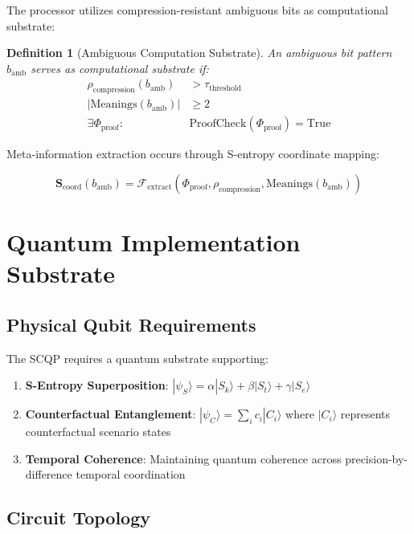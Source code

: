 \documentclass[12pt,a4paper]{article}
\newtheorem{definition}{Definition}
\begin{document}
The processor utilizes compression-resistant ambiguous bits as computational substrate:

\begin{definition}[Ambiguous Computation Substrate]
An ambiguous bit pattern $b_{\text{amb}}$ serves as computational substrate if:
\begin{align}
\rho_{\text{compression}}(b_{\text{amb}}) &> \tau_{\text{threshold}} \\
|\text{Meanings}(b_{\text{amb}})| &\geq 2 \\
\exists \Phi_{\text{proof}}: &\text{ProofCheck}(\Phi_{\text{proof}}) = \text{True}
\end{align}
\end{definition}

Meta-information extraction occurs through S-entropy coordinate mapping:

\begin{equation}
\mathbf{S}_{\text{coord}}(b_{\text{amb}}) = \mathcal{F}_{\text{extract}}(\Phi_{\text{proof}}, \rho_{\text{compression}}, \text{Meanings}(b_{\text{amb}}))
\end{equation}

\section{Quantum Implementation Substrate}

\subsection{Physical Qubit Requirements}

The SCQP requires a quantum substrate supporting:

\begin{enumerate}
\item \textbf{S-Entropy Superposition}: $|\psi_S\rangle = \alpha|S_k\rangle + \beta|S_t\rangle + \gamma|S_e\rangle$
\item \textbf{Counterfactual Entanglement}: $|\psi_C\rangle = \sum_{i} c_i|C_i\rangle$ where $|C_i\rangle$ represents counterfactual scenario states
\item \textbf{Temporal Coherence}: Maintaining quantum coherence across precision-by-difference temporal coordination
\end{enumerate}

\subsection{Circuit Topology}
\end{document}
